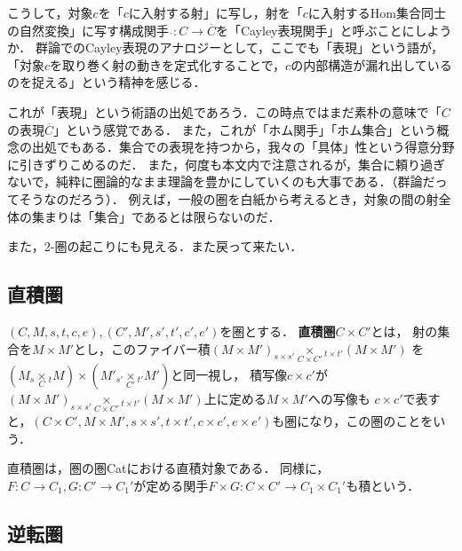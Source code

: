 \documentclass[uplatex, dvipdfmx]{jsreport}
\begin{document}
\begin{remark}
    こうして，対象$c$を「$c$に入射する射」に写し，射を「$c$に入射するHom集合同士の自然変換」に写す構成関手$\overline{　}:C\to\overline{C}$を「Cayley表現関手」と呼ぶことにしようか．
    群論でのCayley表現のアナロジーとして，ここでも「表現」という語が，「対象$c$を取り巻く射の動きを定式化することで，$c$の内部構造が漏れ出しているのを捉える」という精神を感じる．

    これが「表現」という術語の出処であろう．この時点ではまだ素朴の意味で「$C$の表現$\overline{C}$」という感覚である．
    また，これが「ホム関手」「ホム集合」という概念の出処でもある．集合での表現を持つから，我々の「具体」性という得意分野に引きずりこめるのだ．
    また，何度も本文内で注意されるが，集合に頼り過ぎないで，純粋に圏論的なまま理論を豊かにしていくのも大事である．（群論だってそうなのだろう）．
    例えば，一般の圏を白紙から考えるとき，対象の間の射全体の集まりは「集合」であるとは限らないのだ．

    また，2-圏の起こりにも見える．また戻って来たい．
\end{remark}

\subsection{直積圏}

\begin{definition}
    $(C,M,s,t,c,e),(C',M',s',t',c',e')$を圏とする．
    \textbf{直積圏}$C\times C'$とは，
    射の集合を$M\times M'$とし，このファイバー積$(M\times M')_{s\times s'}\underset{C\times C'}{\times}{}_{t\times t'}(M\times M')$
    を$(M_s\underset{C}{\times}{}_tM)\times(M'_{s'}\underset{C'}{\times}{}_{t'}M')$と同一視し，
    積写像$c\times c'$が$(M\times M')_{s\times s'}\underset{C\times C'}{\times}{}_{t\times t'}(M\times M')$上に定める$M\times M'$への写像も
    $c\times c'$で表すと，$(C\times C',M\times M',s\times s',t\times t',c\times c',e\times e')$も圏になり，この圏のことをいう．
\end{definition}
\begin{remark}
    直積圏は，圏の圏Catにおける直積対象である．
    同様に，$F:C\to C_1,G:C'\to C_1'$が定める関手$F\times G:C\times C'\to C_1\times C_1'$も積という．
\end{remark}

\subsection{逆転圏}
\end{document}
